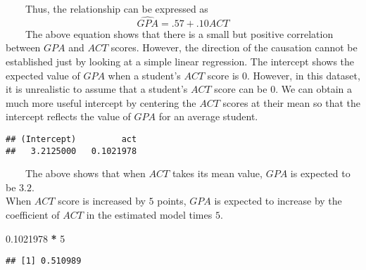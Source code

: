 \documentclass[
]{article}
\newenvironment{Shaded}{\begin{snugshade}}{\end{snugshade}}
\newcommand{\CommentTok}[1]{\textcolor[rgb]{0.56,0.35,0.01}{\textit{#1}}}
\newcommand{\DataTypeTok}[1]{\textcolor[rgb]{0.13,0.29,0.53}{#1}}
\newcommand{\DecValTok}[1]{\textcolor[rgb]{0.00,0.00,0.81}{#1}}
\newcommand{\FloatTok}[1]{\textcolor[rgb]{0.00,0.00,0.81}{#1}}
\newcommand{\KeywordTok}[1]{\textcolor[rgb]{0.13,0.29,0.53}{\textbf{#1}}}
\newcommand{\NormalTok}[1]{#1}
\newcommand{\OperatorTok}[1]{\textcolor[rgb]{0.81,0.36,0.00}{\textbf{#1}}}
\newcommand{\StringTok}[1]{\textcolor[rgb]{0.31,0.60,0.02}{#1}}
\begin{document}
~~~~Thus, the relationship can be expressed as
\[\widehat{GPA} = .57 + .10 ACT\] ~~~~The above equation shows that
there is a small but positive correlation between \(GPA\) and \(ACT\)
scores. However, the direction of the causation cannot be established
just by looking at a simple linear regression. The intercept shows the
expected value of \(GPA\) when a student's \(ACT\) score is \(0\).
However, in this dataset, it is unrealistic to assume that a student's
\(ACT\) score can be \(0\). We can obtain a much more useful intercept
by centering the \(ACT\) scores at their mean so that the intercept
reflects the value of \(GPA\) for an average student.

\begin{Shaded}
\end{Shaded}

\begin{verbatim}
## (Intercept)         act 
##   3.2125000   0.1021978
\end{verbatim}

~~~~The above shows that when \(ACT\) takes its mean value, \(GPA\) is
expected to be \(3.2\).\\
\hspace*{0.333em}\hspace*{0.333em}\hspace*{0.333em}\hspace*{0.333em}When
\(ACT\) score is increased by \(5\) points, \(GPA\) is expected to
increase by the coefficient of \(ACT\) in the estimated model times
\(5\).

\begin{Shaded}
\begin{Highlighting}[]
\FloatTok{0.1021978} \OperatorTok{*}\StringTok{ }\DecValTok{5} 
\end{Highlighting}
\end{Shaded}

\begin{verbatim}
## [1] 0.510989
\end{verbatim}
\end{document}
